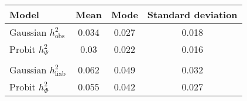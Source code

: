  \begin{tabular}{lccc}
 \hline
 Model & Mean & Mode & Standard deviation  \\ 
 \hline 

 Gaussian $h^2_\text{obs}$ & 0.034 & 0.027 & 0.018 \\ 
 Probit $h^2_{\Psi}$ & 0.03 & 0.022 & 0.016 \\ 
  & & & \\ 
 Gaussian $h^2_\text{liab}$ & 0.062 & 0.049 & 0.032 \\ 
 Probit $h^2_{\Phi}$ & 0.055 & 0.042 & 0.027 \\ 
 \bottomrule
\end{tabular}
